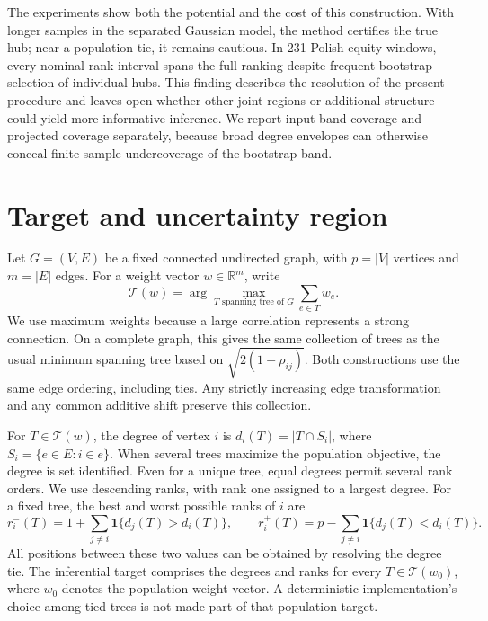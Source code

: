 \documentclass[pdflatex,sn-mathphys-ay]{sn-jnl}
\theoremstyle{thmstyleone}
\theoremstyle{thmstyletwo}
\newcommand{\T}{\mathcal T}
\newcommand{\ind}{\mathbf 1}
\begin{document}
The experiments show both the potential and the cost of this construction. With longer samples in the separated Gaussian model, the method certifies the true hub; near a population tie, it remains cautious. In 231 Polish equity windows, every nominal rank interval spans the full ranking despite frequent bootstrap selection of individual hubs. This finding describes the resolution of the present procedure and leaves open whether other joint regions or additional structure could yield more informative inference. We report input-band coverage and projected coverage separately, because broad degree envelopes can otherwise conceal finite-sample undercoverage of the bootstrap band.

\section{Target and uncertainty region}\label{sec:target}
Let $G=(V,E)$ be a fixed connected undirected graph, with $p=|V|$ vertices and $m=|E|$ edges. For a weight vector $w\in\mathbb R^m$, write
\begin{equation}
 \T(w)=\arg\max_{T\text{ spanning tree of }G}\sum_{e\in T}w_e.
\end{equation}
We use maximum weights because a large correlation represents a strong connection. On a complete graph, this gives the same collection of trees as the usual minimum spanning tree based on $\sqrt{2(1-\rho_{ij})}$. Both constructions use the same edge ordering, including ties. Any strictly increasing edge transformation and any common additive shift preserve this collection.

For $T\in\T(w)$, the degree of vertex $i$ is $d_i(T)=|T\cap S_i|$, where $S_i=\{e\in E:i\in e\}$. When several trees maximize the population objective, the degree is set identified. Even for a unique tree, equal degrees permit several rank orders. We use descending ranks, with rank one assigned to a largest degree. For a fixed tree, the best and worst possible ranks of $i$ are
\begin{equation}\label{eq:trueranks}
 r_i^-(T)=1+\sum_{j\ne i}\ind\{d_j(T)>d_i(T)\},\qquad
 r_i^+(T)=p-\sum_{j\ne i}\ind\{d_j(T)<d_i(T)\}.
\end{equation}
All positions between these two values can be obtained by resolving the degree tie. The inferential target comprises the degrees and ranks for every $T\in\T(w_0)$, where $w_0$ denotes the population weight vector. A deterministic implementation's choice among tied trees is not made part of that population target.
\end{document}
